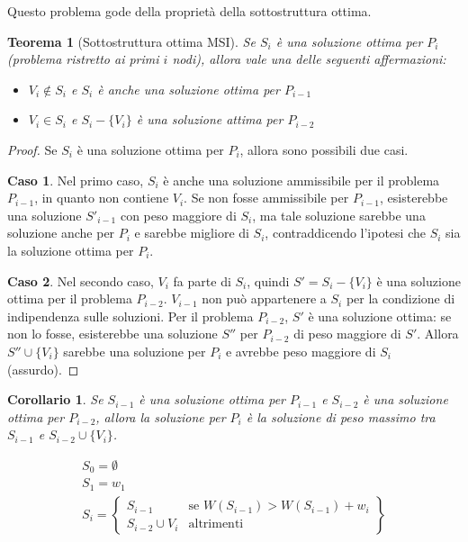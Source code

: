 \documentclass[11pt]{article}
\newtheorem*{theorem}{Teorema}
\newtheorem*{corollary}{Corollario}
\begin{document}
Questo problema gode della proprietà della sottostruttura ottima.
\begin{theorem}[Sottostruttura ottima MSI]
    Se $S_i$ è una soluzione ottima per $P_i$ (problema ristretto ai primi $i$ nodi), allora vale una delle seguenti affermazioni:
    \begin{itemize}
        \item $V_i \notin S_i$ e $S_i$ è anche una soluzione ottima per $P_{i-1}$
        \item $V_i \in S_i$ e $S_i-\{V_i\}$ è una soluzione attima per $P_{i-2}$
    \end{itemize}
\end{theorem}
\begin{proof}
    Se $S_i$ è una soluzione ottima per $P_i$, allora sono possibili due casi.

    \textbf{Caso 1}. Nel primo caso, $S_i$ è anche una soluzione ammissibile per il problema $P_{i-1}$, in quanto non contiene 
    $V_i$. Se non fosse ammissibile per $P_{i-1}$, esisterebbe una soluzione $S'_{i-1}$ con peso maggiore di $S_i$, ma tale 
    soluzione sarebbe una soluzione anche per $P_i$ e sarebbe migliore di $S_i$, contraddicendo l'ipotesi che $S_i$ sia 
    la soluzione ottima per $P_i$.

    \textbf{Caso 2}. Nel secondo caso, $V_i$ fa parte di $S_i$, quindi $S'=S_i-\{V_i\}$ è una soluzione ottima per il problema 
    $P_{i-2}$. $V_{i-1}$ non può appartenere a $S_i$ per la condizione di indipendenza sulle soluzioni. Per il problema 
    $P_{i-2}$, $S'$ è una soluzione ottima: se non lo fosse, esisterebbe una soluzione $S''$ per $P_{i-2}$ di peso maggiore 
    di $S'$. Allora $S''\cup \{V_i\}$ sarebbe una soluzione per $P_i$ e avrebbe peso maggiore di $S_i$ (assurdo). 
\end{proof}
\begin{corollary}
    Se $S_{i-1}$ è una soluzione ottima per $P_{i-1}$ e $S_{i-2}$ è una soluzione ottima per $P_{i-2}$, allora la soluzione 
    per $P_i$ è la soluzione di peso massimo tra $S_{i-1}$ e $S_{i-2}\cup \{V_i\}$.
\end{corollary}
\begin{equation*}
    \begin{split}
        S_0=\emptyset\\
        S_1=w_1\\
        S_i = 
        \left\{
            \begin{array}{lr}
                S_{i-1}&\text{se } W(S_{i-1})> W(S_{i-1})+w_i\\
                S_{i-2}\cup V_i&\text{altrimenti}
            \end{array}
        \right\}
    \end{split}
\end{equation*}
\end{document}
